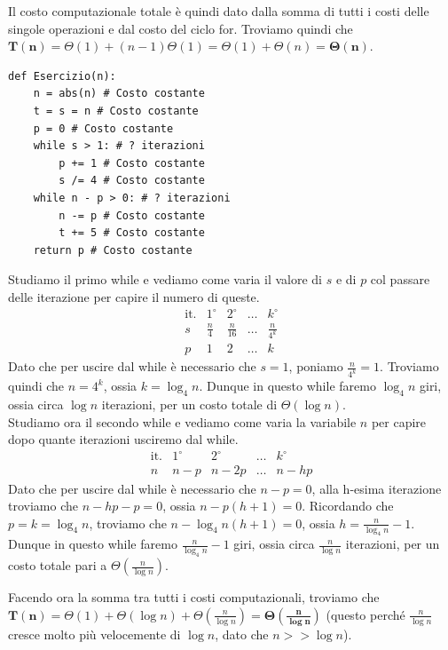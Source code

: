 \documentclass[11pt, a4paper, titlepage, oneside]{scrbook}
\begin{document}
Il costo computazionale totale è quindi dato dalla somma di tutti i costi delle singole operazioni e dal costo del ciclo for. Troviamo quindi che \mbox{$\bm{T(n)} = \Theta(1) + (n-1) \Theta(1) = \Theta(1) + \Theta(n) = \bm{\Theta(n)}$}.

\Separatore

\begin{lstlisting}[style=Python]
def Esercizio(n):
    n = abs(n) # Costo costante
    t = s = n # Costo costante
    p = 0 # Costo costante
    while s > 1: # ? iterazioni
        p += 1 # Costo costante
        s /= 4 # Costo costante
    while n - p > 0: # ? iterazioni
        n -= p # Costo costante
        t += 5 # Costo costante
    return p # Costo costante
\end{lstlisting}

Studiamo il primo while e vediamo come varia il valore di $s$ e di $p$ col passare delle iterazione per capire il numero di queste.
\[
\begin{array}{c|cccc}
    \text{it.} & 1^\circ & 2^\circ & \dots & k^\circ \\ \hline 
    s & \frac{n}{4} & \frac{n}{16} & \dots & \frac{n}{4^k} \\
    p & 1 & 2 & \dots & k
\end{array}
\]
Dato che per uscire dal while è necessario che $s = 1$, poniamo $\frac{n}{4^k} = 1$. Troviamo quindi che $n = 4^k$, ossia $k = \log_4 n$. Dunque in questo while faremo $\log_4 n$ giri, ossia circa $\log n$ iterazioni, per un costo totale di $\Theta(\log n)$. \\
Studiamo ora il secondo while e vediamo come varia la variabile $n$ per capire dopo quante iterazioni usciremo dal while.
\[
\begin{array}{c|cccc}
    \text{it.} & 1^\circ & 2^\circ & \dots & k^\circ \\ \hline 
    n & n- p & n - 2p & \dots & n - hp
\end{array}
\]
Dato che per uscire dal while è necessario che $n-p = 0$, alla h-esima iterazione troviamo che $n - hp - p = 0$, ossia $n - p(h+1) = 0$. Ricordando che $p = k = \log_4 n$, troviamo che $n - \log_4 n (h+1) = 0$, ossia $h = \frac{n}{\log_4 n} - 1$. Dunque in questo while faremo $\frac{n}{\log_4 n} - 1$ giri, ossia circa $\frac{n}{\log n}$ iterazioni, per un costo totale pari a $\Theta(\frac{n}{\log n})$.

Facendo ora la somma tra tutti i costi computazionali, troviamo che \mbox{$\bm{T(n)} = \Theta(1) + \Theta(\log n) + \Theta(\frac{n}{\log n}) = \bm{\Theta(\frac{n}{\log n})}$} (questo perché $\frac{n}{\log n}$ cresce molto più velocemente di $\log n$, dato che $n >> \log n$).
\end{document}
